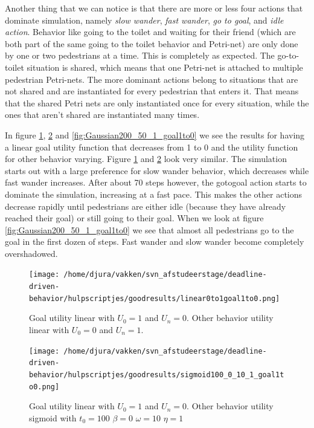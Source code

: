 \documentclass[11pt]{book}
\begin{document}
Another thing that we can notice is that there are more or less four actions that dominate simulation, namely \emph{slow wander}, \emph{fast wander}, \emph{go to goal}, and \emph{idle action}.
 Behavior like going to the toilet and waiting for their friend (which are both part of the same going to the toilet behavior and Petri-net) are only done by one or two pedestrians at a time. This is completely as expected. The go-to-toilet situation is shared, which means that one Petri-net is attached to multiple pedestrian Petri-nets. The more dominant actions belong to situations that are not shared and are instantiated for every pedestrian that enters it. That means that the shared Petri nets are only instantiated once for every situation, while the ones that aren't shared are instantiated many times.

In figure \ref{fig:linear0to1goal1to0}, \ref{fig:sigmoid100_0_10_1_goal1to0} and \ref{fig:Gaussian200_50_1_goal1to0} we see the results for having a linear goal utility function that decreases from 1 to 0 and the utility function for other behavior varying. Figure \ref{fig:linear0to1goal1to0} and \ref{fig:sigmoid100_0_10_1_goal1to0} look very similar. The simulation starts out with a large preference for slow wander behavior, which decreases while fast wander increases. After about 70 steps however, the gotogoal action starts to dominate the simulation, increasing at a fast pace. This makes the other actions decrease rapidly until pedestrians are either idle (because they have already reached their goal) or still going to their goal. When we look at figure \ref{fig:Gaussian200_50_1_goal1to0} we see that almost all pedestrians go to the goal in the first dozen of steps. Fast wander and slow wander become completely overshadowed.


\begin{figure}[h!]
\centering            
\texttt{[image: /home/djura/vakken/svn\_afstudeerstage/deadline-driven-behavior/hulpscriptjes/goodresults/linear0to1goal1to0.png]}
\caption{Goal utility linear with $U_0=1$ and $U_n = 0$. Other behavior utility linear with  $U_0=0$ and $U_n=1$.}
\label{fig:linear0to1goal1to0}
\end{figure} 

\begin{figure}[h!]
\texttt{[image: /home/djura/vakken/svn\_afstudeerstage/deadline-driven-behavior/hulpscriptjes/goodresults/sigmoid100\_0\_10\_1\_goal1to0.png]}
\caption{Goal utility linear with $U_0=1$ and $U_n = 0$. Other behavior utility sigmoid with $t_0=100$ $\beta=0$ $\omega=10$ $\eta=1$}
\label{fig:sigmoid100_0_10_1_goal1to0}
\end{figure}
\end{document}
